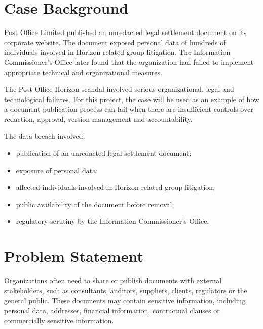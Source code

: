 \documentclass[12pt,a4paper]{article}
\begin{document}
\section{Case Background}

\begin{alertbox}
Post Office Limited published an unredacted legal settlement document on its corporate website. The document exposed personal data of hundreds of individuals involved in Horizon-related group litigation. The Information Commissioner's Office later found that the organization had failed to implement appropriate technical and organizational measures.
\end{alertbox}

\medskip

The Post Office Horizon scandal involved serious organizational, legal and technological failures. For this project, the case will be used as an example of how a document publication process can fail when there are insufficient controls over redaction, approval, version management and accountability.

The data breach involved:

\begin{itemize}
    \item publication of an unredacted legal settlement document;
    \item exposure of personal data;
    \item affected individuals involved in Horizon-related group litigation;
    \item public availability of the document before removal;
    \item regulatory scrutiny by the Information Commissioner's Office.
\end{itemize}

\section{Problem Statement}

Organizations often need to share or publish documents with external stakeholders, such as consultants, auditors, suppliers, clients, regulators or the general public. These documents may contain sensitive information, including personal data, addresses, financial information, contractual clauses or commercially sensitive information.
\end{document}
